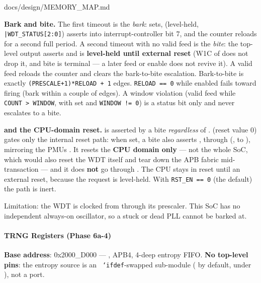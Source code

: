 \begin{relocated}{docs/design/MEMORY_MAP.md}
{}

\textbf{Bark and bite.} The first timeout is the \emph{bark}:
 sets,  (level-held,
\texttt{|WDT\_\allowbreak{}STATUS[2:\allowbreak{}0]}) asserts into
interrupt-controller bit 7, and the counter reloads for a second full
period. A second timeout with no valid feed is the \emph{bite}: the
top-level output  asserts and is \textbf{level-held
until external reset} (W1C of  does not drop it, and
bite is terminal --- a later feed or enable does not revive it). A valid
feed reloads the counter and clears the bark-to-bite escalation.
Bark-to-bite is exactly
\texttt{(PRESCALE+\allowbreak{}1)*RELOAD\ +\allowbreak{}\ 1}
 edges. \texttt{RELOAD\ =\allowbreak{}=\allowbreak{}\ 0}
while enabled fails toward firing (bark within a couple of edges). A
window violation (valid feed while \texttt{COUNT\ >\ WINDOW}, with
 set and \texttt{WINDOW\ !=\allowbreak{}\ 0}) is a status
bit only and never escalates to a bite.

\textbf{ and the CPU-domain reset.}  is
asserted by a bite \emph{regardless} of .
 (reset value 0) gates only the internal reset path: when
set, a bite also asserts , through
 (,  to
), mirroring the PMU\textquotesingle s
. It resets the \textbf{CPU domain only} ---
not the whole SoC, which would also reset the WDT itself and tear down
the APB fabric mid-transaction --- and it does \textbf{not} go through
. The CPU stays in reset until an external reset, because
the request is level-held. With
\texttt{RST\_\allowbreak{}EN\ =\allowbreak{}=\allowbreak{}\ 0} (the
default) the path is inert.

Limitation: the WDT is clocked from  through its
prescaler. This SoC has no independent always-on oscillator, so a stuck
or dead PLL cannot be barked at.

\paragraph{TRNG Registers (Phase 6a-4)}\label{ds:mm:memory-map:trng-registers-phase-6a-4}

\textbf{Base address}: 0x2000\_\allowbreak{}D000 ---
, APB4, 4-deep entropy FIFO. \textbf{No
top-level pins}: the entropy source is an \texttt{\ `ifdef}-swapped
sub-module ( by default,
 under ), not a port.


\end{relocated}
